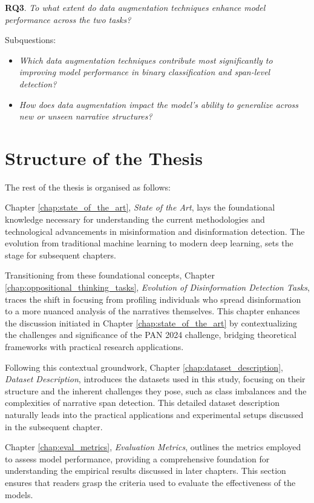 \documentclass{Configuration_Files/PoliMi3i_thesis}
\begin{document}
\textbf{RQ3}. \textit{To what extent do data augmentation techniques enhance model performance across the two tasks?}

Subquestions:
\begin{itemize}
\item \textit{Which data augmentation techniques contribute most significantly to improving model performance in binary classification and span-level detection?}
\item \textit{How does data augmentation impact the model's ability to generalize across new or unseen narrative structures?}
\end{itemize}


\section{Structure of the Thesis}
The rest of the thesis is organised as follows:

Chapter \ref{chap:state_of_the_art}, \textit{State of the Art}, lays the foundational knowledge necessary for understanding the current methodologies and technological advancements in misinformation and disinformation detection. The evolution from traditional machine learning to modern deep learning, sets the stage for subsequent chapters.

Transitioning from these foundational concepts, Chapter \ref{chap:oppositional_thinking_tasks}, \textit{Evolution of Disinformation Detection Tasks}, traces the shift in focusing from profiling individuals who spread disinformation to a more nuanced analysis of the narratives themselves. This chapter enhances the discussion initiated in Chapter \ref{chap:state_of_the_art} by contextualizing the challenges and significance of the PAN 2024 challenge, bridging theoretical frameworks with practical research applications.

Following this contextual groundwork, Chapter \ref{chap:dataset_description}, \textit{Dataset Description}, introduces the datasets used in this study, focusing on their structure and the inherent challenges they pose, such as class imbalances and the complexities of narrative span detection. This detailed dataset description naturally leads into the practical applications and experimental setups discussed in the subsequent chapter.

Chapter \ref{chap:eval_metrics}, \textit{Evaluation Metrics}, outlines the metrics employed to assess model performance, providing a comprehensive foundation for understanding the empirical results discussed in later chapters. This section ensures that readers grasp the criteria used to evaluate the effectiveness of the models.
\end{document}
